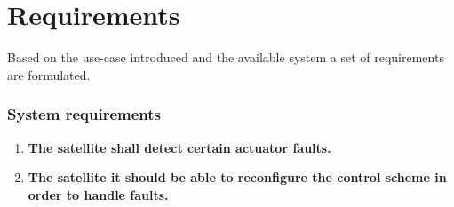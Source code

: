 \chapter{Requirements}\label{chap:requirements}
Based on the use-case introduced and the available system a set of requirements are formulated.
%
\subsection*{System requirements}
%
\begin{enumerate}
	\item \textbf{The satellite shall detect certain actuator faults.}
	
	
	
	\item \textbf{The satellite it should be able to reconfigure the control scheme in order to handle faults.}
	
	
	
\end{enumerate}


